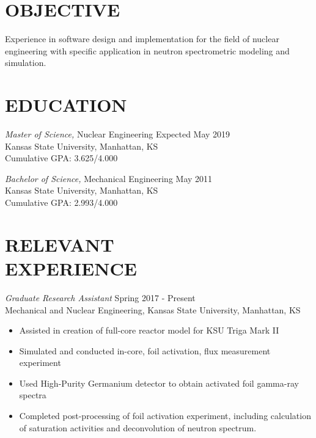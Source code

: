 \documentclass[margin, 10pt]{res} %
\begin{document}
\begin{resume}
 
\section{OBJECTIVE}  

Experience in software design and implementation for the field of nuclear engineering with specific application in neutron spectrometric modeling and simulation.

\section{EDUCATION}

{\sl Master of Science,} Nuclear Engineering \hfill Expected May 2019\\
Kansas State University, Manhattan, KS \\
Cumulative GPA: 3.625/4.000

{\sl Bachelor of Science,} Mechanical Engineering \hfill May 2011 \\
Kansas State University, Manhattan, KS \\
Cumulative GPA: 2.993/4.000


\section{RELEVANT \\ EXPERIENCE}

{\sl Graduate Research Assistant} \hfill Spring 2017 - Present \\
Mechanical and Nuclear Engineering, Kansas State University, Manhattan, KS
\begin{itemize}
    \item Assisted in creation of full-core reactor model for KSU Triga Mark II
    \item Simulated and conducted in-core, foil activation, flux measurement experiment
    \item Used High-Purity Germanium detector to obtain activated foil gamma-ray spectra
    \item Completed post-processing of foil activation experiment, including calculation of saturation activities and deconvolution of neutron spectrum.
\end{itemize}


\end{resume}
\end{document}
